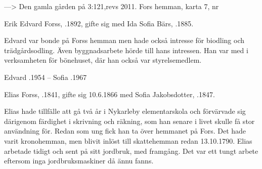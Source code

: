 ---> Den gamla gården på  3:121,revs 2011. Fors hemman, karta 7, nr 

Erik Edvard Forss, .1892, gifte sig med Ida Sofia Bärs, .1885.
\begin{jhchildren}
  \item {}
  \item {}
  \item {}
\end{jhchildren}

Edvard var bonde på Forss hemman men hade också intresse för biodling och trädgårdsodling. Även byggnadsarbete hörde till hans intressen. Han var med i verksamheten för bönehuset, där han också var styrelsemedlem.

Edvard .1954  --  Sofia .1967


Elias Forss, .1841, gifte sig 10.6.1866 med Sofia Jakobsdotter, .1847.
\begin{jhchildren}
  \item {}
  \item {}
  \item {}
  \item {}
  \item {}
  \item {}
  \item {}
  \item {}
  \item {}
  \item {}
\end{jhchildren}

Elias hade tillfälle att gå två år i Nykarleby elementarskola och förvärvade sig därigenom färdighet i skrivning och räkning, som han senare i livet skulle få stor användning för. Redan som ung fick han ta över hemmanet på Fors. Det hade varit kronohemman, men blivit inlöst till skattehemman redan 13.10.1790. Elias arbetade tidigt och sent på sitt jordbruk, med framgång. Det var ett tungt arbete eftersom inga jordbruksmaskiner då ännu fanns.

